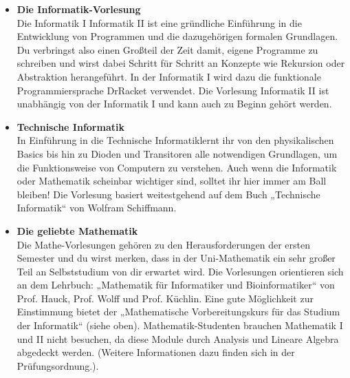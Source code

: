 \ifbachelor
{}
\begin{itemize}
	\item 
	\textbf{Die Informatik-Vorlesung} \\
	Die 
	\ifwintersemester Informatik I \fi
	\ifsommersemester Informatik II \fi 
	ist eine gründliche Einführung in die Entwicklung von Programmen und die dazugehörigen formalen Grundlagen. 
	Du verbringst also einen Großteil der Zeit damit, eigene Programme zu schreiben und wirst dabei Schritt für Schritt 
	an Konzepte wie Rekursion oder Abstraktion herangeführt. 
	\ifwintersemester In der Informatik I wird dazu die funktionale Programmiersprache DrRacket verwendet. \fi
	\ifsommersemester Die Vorlesung Informatik II ist unabhängig von der Informatik I und kann auch zu Beginn gehört werden. \fi
	
	\ifinfo
	\ifwintersemester
	\item 
	\textbf{Technische Informatik} \\
	In \glqq Einführung in die Technische Informatik\grqq lernt ihr von den physikalischen Basics bis hin zu Dioden und Transitoren alle notwendigen Grundlagen, um die Funktionsweise von Computern zu verstehen. Auch wenn die Informatik oder Mathematik scheinbar wichtiger sind, solltet ihr hier immer am Ball bleiben! Die Vorlesung basiert weitestgehend auf dem Buch „Technische Informatik“ von Wolfram Schiffmann.
	\fi
	\fi
	
	\item 
	\textbf{Die geliebte Mathematik} \\
	Die Mathe-Vorlesungen gehören zu den Herausforderungen der ersten Semester und du wirst merken, dass in der Uni-Mathematik ein sehr großer Teil an Selbststudium von dir erwartet wird. Die Vorlesungen orientieren sich an dem Lehrbuch: „Mathematik für Informatiker und Bioinformatiker“ von Prof. Hauck, Prof. Wolff und Prof. Küchlin. Eine gute Möglichkeit zur Einstimmung bietet der „Mathematische Vorbereitungskurs für das Studium der Informatik“ (siehe oben). 
	\iflehramt
	Mathematik-Studenten brauchen Mathematik I
	und II nicht besuchen, da diese Module durch Analysis und Lineare Algebra
	abgedeckt werden. (Weitere Informationen dazu finden sich in der
	Prüfungsordnung.).
	\fi
\end{itemize}
\fi


\iflehramt
\pagebreak
\fi
